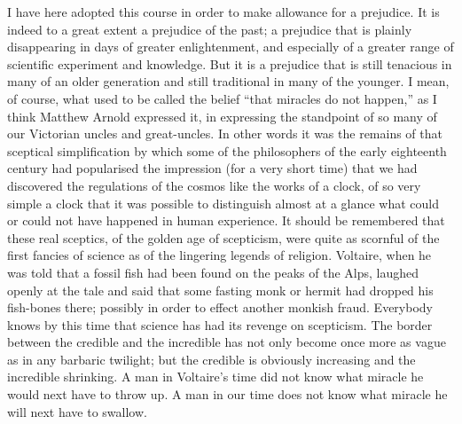 \documentclass{book}
\begin{document}
I have here adopted this course in order to make allowance for a prejudice. It is indeed to a great extent a prejudice of the past; a prejudice that is plainly disappearing in days of greater enlightenment, and especially of a greater range of scientific experiment and knowledge. But it is a prejudice that is still tenacious in many of an older generation and still traditional in many of the younger. I mean, of course, what used to be called the belief “that miracles do not happen,” as I think Matthew Arnold expressed it, in expressing the standpoint of so many of our Victorian uncles and great-uncles. In other words it was the remains of that sceptical simplification by which some of the philosophers of the early eighteenth century had popularised the impression (for a very short time) that we had discovered the regulations of the cosmos like the works of a clock, of so very simple a clock that it was possible to distinguish almost at a glance what could or could not have happened in human experience. It should be remembered that these real sceptics, of the golden age of scepticism, were quite as scornful of the first fancies of science as of the lingering legends of religion. Voltaire, when he was told that a fossil fish had been found on the peaks of the Alps, laughed openly at the tale and said that some fasting monk or hermit had dropped his fish-bones there; possibly in order to effect another monkish fraud. Everybody knows by this time that science has had its revenge on scepticism. The border between the credible and the incredible has not only become once more as vague as in any barbaric twilight; but the credible is obviously increasing and the incredible shrinking. A man in Voltaire’s time did not know what miracle he would next have to throw up. A man in our time does not know what miracle he will next have to swallow.
\end{document}
